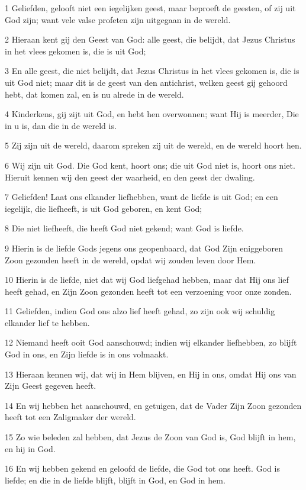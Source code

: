 \par 1 Geliefden, gelooft niet een iegelijken geest, maar beproeft de geesten, of zij uit God zijn; want vele valse profeten zijn uitgegaan in de wereld.
\par 2 Hieraan kent gij den Geest van God: alle geest, die belijdt, dat Jezus Christus in het vlees gekomen is, die is uit God;
\par 3 En alle geest, die niet belijdt, dat Jezus Christus in het vlees gekomen is, die is uit God niet; maar dit is de geest van den antichrist, welken geest gij gehoord hebt, dat komen zal, en is nu alrede in de wereld.
\par 4 Kinderkens, gij zijt uit God, en hebt hen overwonnen; want Hij is meerder, Die in u is, dan die in de wereld is.
\par 5 Zij zijn uit de wereld, daarom spreken zij uit de wereld, en de wereld hoort hen.
\par 6 Wij zijn uit God. Die God kent, hoort ons; die uit God niet is, hoort ons niet. Hieruit kennen wij den geest der waarheid, en den geest der dwaling.
\par 7 Geliefden! Laat ons elkander liefhebben, want de liefde is uit God; en een iegelijk, die liefheeft, is uit God geboren, en kent God;
\par 8 Die niet liefheeft, die heeft God niet gekend; want God is liefde.
\par 9 Hierin is de liefde Gods jegens ons geopenbaard, dat God Zijn eniggeboren Zoon gezonden heeft in de wereld, opdat wij zouden leven door Hem.
\par 10 Hierin is de liefde, niet dat wij God liefgehad hebben, maar dat Hij ons lief heeft gehad, en Zijn Zoon gezonden heeft tot een verzoening voor onze zonden.
\par 11 Geliefden, indien God ons alzo lief heeft gehad, zo zijn ook wij schuldig elkander lief te hebben.
\par 12 Niemand heeft ooit God aanschouwd; indien wij elkander liefhebben, zo blijft God in ons, en Zijn liefde is in ons volmaakt.
\par 13 Hieraan kennen wij, dat wij in Hem blijven, en Hij in ons, omdat Hij ons van Zijn Geest gegeven heeft.
\par 14 En wij hebben het aanschouwd, en getuigen, dat de Vader Zijn Zoon gezonden heeft tot een Zaligmaker der wereld.
\par 15 Zo wie beleden zal hebben, dat Jezus de Zoon van God is, God blijft in hem, en hij in God.
\par 16 En wij hebben gekend en geloofd de liefde, die God tot ons heeft. God is liefde; en die in de liefde blijft, blijft in God, en God in hem.
